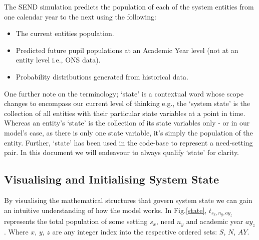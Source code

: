 \documentclass[margin=5mm]{article}
\begin{document}
The SEND simulation predicts the population of each of the system
entities from one calendar year to the next using the following:

\begin{itemize}
\item The current entities population.
\item Predicted future pupil populations at an Academic Year level (not at
  an entity level i.e., ONS data).
\item Probability distributions generated from historical data.
\end{itemize}

One further note on the terminology; `state' is a contextual word
whose scope changes to encompass our current level of thinking e.g.,
the `system state' is the collection of all entities with their
particular state variables at a point in time.  Whereas an entity's
`state' is the collection of its state variables only - or in our
model's case, as there is only one state variable, it's simply the
population of the entity.  Further, `state' has been used in the
code-base to represent a need-setting pair.  In this document we will
endeavour to always qualify `state' for clarity.

\subsection{Visualising and Initialising System State}
By visualising the mathematical structures that govern system state we
can gain an intuitive understanding of how the model works.  In
Fig.\ref{state}, $t_{s_x,n_y,ay_z}$ represents the total population of
some setting $s_x$, need $n_y$ and academic year $ay_z$.  Where $x$,
$y$, $z$ are any integer index into the respective ordered sets: $S$,
$N$, $AY$.
\end{document}
